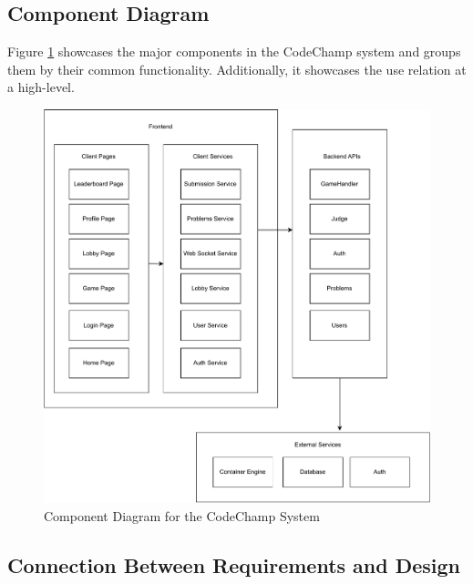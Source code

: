 \documentclass[12pt, titlepage]{article}
\begin{document}
\subsection{Component Diagram}
Figure \ref{fig:comp} showcases the major components in the CodeChamp system and groups them by their common functionality. Additionally, it showcases the use relation at a high-level.
\begin{figure}[H]
\centering
\includegraphics[width=1.0\textwidth]{Design/SystDesign/ComponentDiagram.pdf}
\caption{Component Diagram for the CodeChamp System}\label{fig:comp}
\end{figure}

\subsection{Connection Between Requirements and Design} \label{SecConnection}
\end{document}
